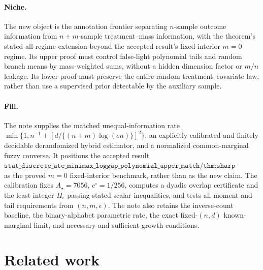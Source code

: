 \documentclass{article}
\begin{document}
\paragraph{Niche.} The new object is the annotation frontier separating \(n\)-sample outcome information from \(n+m\)-sample treatment--mass information, with the theorem's stated all-regime extension beyond the accepted result's fixed-interior \(m=0\) regime.  Its upper proof must control false-light polynomial tails and random branch means by mass-weighted sums, without a hidden dimension factor or \(m/n\) leakage.  Its lower proof must preserve the entire random treatment--covariate law, rather than use a supervised prior detectable by the auxiliary sample.

\paragraph{Fill.} The note supplies the matched unequal-information rate \(\min\{1,n^{-1}+[d/\{(n+m)\log(en)\}]^2\}\), an explicitly calibrated and finitely decidable derandomized hybrid estimator, and a normalized common-marginal fuzzy converse.  It positions the accepted result \(\texttt{stat\_discrete\_ate\_minimax\_loggap\_polynomial\_upper\_match/thm:sharp-minimax-fixed-interior}\) as the proved \(m=0\) fixed-interior benchmark, rather than as the new claim.  The calibration fixes \(A_\star=7056\), \(c^\circ=1/256\), computes a dyadic overlap certificate and the least integer \(H_\epsilon\) passing stated scalar inequalities, and tests all moment and tail requirements from \((n,m,\epsilon)\).  The note also retains the inverse-count baseline, the binary-alphabet parametric rate, the exact fixed-\((n,d)\) known-marginal limit, and necessary-and-sufficient growth conditions.

\section{Related work}
\end{document}
